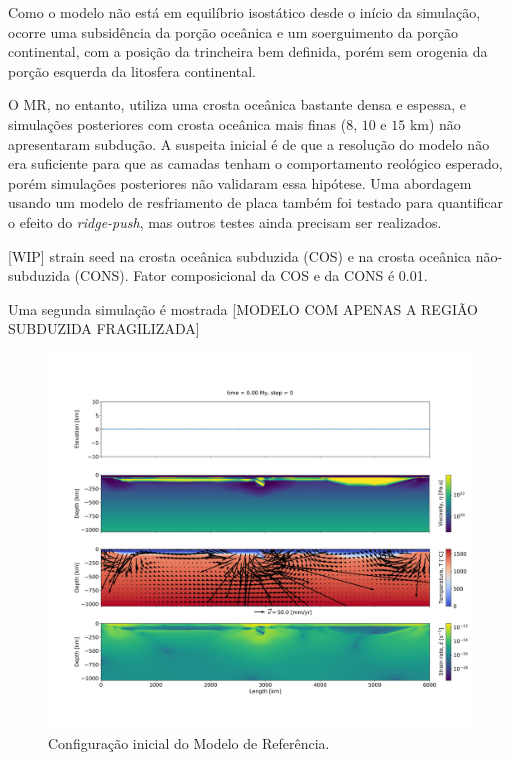Como o modelo não está em equilíbrio isostático desde o início da simulação, ocorre uma subsidência da porção oceânica e um soerguimento da porção continental, com a posição da trincheira bem definida, porém sem orogenia da porção esquerda da litosfera continental.

O MR, no entanto, utiliza uma crosta oceânica bastante densa e espessa, e simulações posteriores com crosta oceânica mais finas ($8$, $10$ e $15$ km) não apresentaram subdução. A suspeita inicial é de que a resolução do modelo não era suficiente para que as camadas tenham o comportamento reológico esperado, porém simulações posteriores não validaram essa hipótese. Uma abordagem usando um modelo de resfriamento de placa \citep{turcotte2002geodynamics} também foi testado para quantificar o efeito do \textit{ridge-push}, mas outros testes ainda precisam ser realizados.


[WIP] strain seed na crosta oceânica subduzida (COS) e na crosta oceânica não-subduzida (CONS). Fator composicional da COS e da CONS é 0.01.


Uma segunda simulação é mostrada 
[MODELO COM APENAS A REGIÃO SUBDUZIDA FRAGILIZADA]

\begin{figure}
    \centering
    \includegraphics[trim={5cm 14cm 2cm 12cm}, clip, width=1.0 \textwidth]{fig/strak_32-00.png}
    \caption{Configuração inicial do Modelo de Referência.}
    \label{fig:inicio-referencia}
\end{figure}

